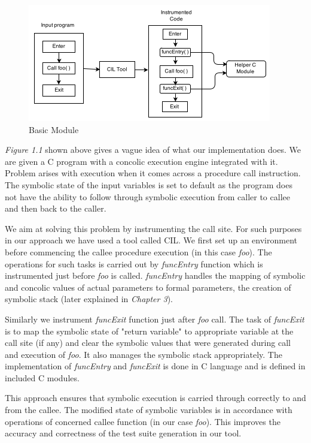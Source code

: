 \documentclass[12pt,oneside]{book}
\begin{document}
\begin{figure}[htbp]
\centering
\includegraphics[scale=1]{module3.png}
\caption{Basic Module}
\end{figure}

\textit{Figure 1.1} shown above gives a vague idea of what our implementation does. We are given a C program with a concolic execution engine integrated with it. Problem arises with execution when it comes across a procedure call instruction. The symbolic state of the input variables is set to default as the program does not have the ability to follow through symbolic execution from caller to callee and then back to the caller.

We aim at solving this problem by instrumenting the call site. For such purposes in our approach we have used a tool called CIL. We first set up an environment before commencing the callee procedure execution (in this case \textit{foo}). The operations for such tasks is carried out by \textit{funcEntry} function which is instrumented just before \textit{foo} is called. \textit{funcEntry} handles the mapping of symbolic and concolic values of actual parameters to formal parameters, the creation of symbolic stack (later explained in \textit{Chapter 3}).

Similarly we instrument \textit{funcExit} function just after \textit{foo} call. The task of \textit{funcExit} is to map the symbolic state of "return variable" to appropriate variable at the call site (if any) and clear the symbolic values that were generated during call and execution of \textit{foo}. It also manages the symbolic stack appropriately. The implementation of \textit{funcEntry} and \textit{funcExit} is done in C language and is defined in included C modules.

This approach ensures that symbolic execution is carried through correctly to and from the callee. The modified state of symbolic variables is in accordance with operations of concerned callee function (in our case \textit{foo}). This improves the accuracy and correctness of the test suite generation in our tool.  
\end{document}
